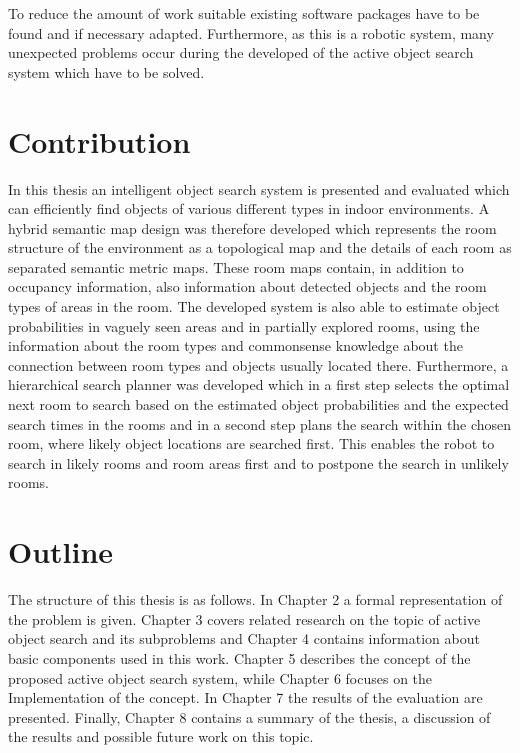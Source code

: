 To reduce the amount of work suitable existing software packages have to be found and if necessary adapted. Furthermore, as this is a robotic system, many unexpected problems occur during the developed of the active object search system which have to be solved.

\section{Contribution}

In this thesis an intelligent object search system is presented and evaluated which can efficiently find objects of various different types in indoor environments. A hybrid semantic map design was therefore developed which represents the room structure of the environment as a topological map and the details of each room as separated semantic metric maps. These room maps contain, in addition to occupancy information, also information about detected objects and the room types of areas in the room. The developed system is also able to estimate object probabilities in vaguely seen areas and in partially explored rooms, using the information about the room types and commonsense knowledge about the connection between room types and objects usually located there. Furthermore, a hierarchical search planner was developed which in a first step selects the optimal next room to search based on the estimated object probabilities and the expected search times in the rooms and in a second step plans the search within the chosen room, where likely object locations are searched first. This enables the robot to search in likely rooms and room areas first and to postpone the search in unlikely rooms.

\section{Outline}

The structure of this thesis is as follows. In Chapter 2 a formal representation of the problem is given. Chapter 3 covers related research on the topic of active object search and its subproblems and Chapter 4 contains information about basic components used in this work. Chapter 5 describes the concept of the proposed active object search system, while Chapter 6 focuses on the Implementation of the concept. In Chapter 7 the results of the evaluation are presented. Finally, Chapter 8 contains a summary of the thesis, a discussion of the results and possible future work on this topic.